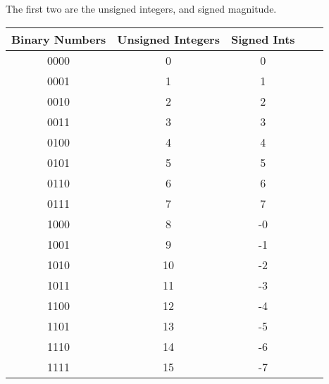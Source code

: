 \documentclass[12pt]{article}
\begin{document}
  The first two are the unsigned integers, and signed magnitude. 
    \begin{center}
        \begin{tabular}{|c|c|c|c|c|}
          \hline
          Binary Numbers & Unsigned Integers & Signed Ints \\
          \hline
          0000 & 0 & 0\\ 
          0001 & 1 & 1\\  
          0010 & 2 & 2\\  
          0011 & 3 & 3\\  
          0100 & 4 & 4\\  
          0101 & 5 & 5\\  
          0110 & 6 & 6\\         
          0111 & 7 & 7\\  
          1000 & 8 & -0\\  
          1001 & 9 & -1\\  
          1010 & 10 & -2\\
          1011 & 11 & -3\\
          1100 & 12 & -4\\
          1101 & 13 & -5\\
          1110 & 14 & -6\\
          1111 & 15 & -7\\
          \hline
        \end{tabular}
    \end{center}
  
        
\end{document}

